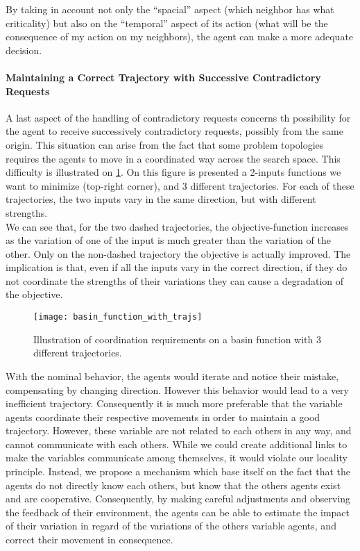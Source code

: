 By taking in account not only the \enquote{spacial} aspect (which neighbor has what criticality) but also on the \enquote{temporal} aspect of its action (what will be the consequence of my action on my neighbors), the agent can make a more adequate decision.

\paragraph*{Maintaining a Correct Trajectory with Successive Contradictory Requests}

A last aspect of the handling of contradictory requests concerns th possibility for the agent to receive successively contradictory requests, possibly from the same origin. This situation can arise from the fact that some problem topologies requires the agents to move in a coordinated way across the search space. This difficulty is illustrated on \figurename{} \ref{basin_fun_illustration}. On this figure is presented a 2-inputs functions we want to minimize (top-right corner), and 3 different trajectories. For each of these trajectories, the two inputs vary in the same direction, but with different strengths.\\
We can see that, for the two dashed trajectories, the objective-function increases as the variation of one of the input is much greater than the variation of the other. Only on the non-dashed trajectory the objective is actually improved. The implication is that, even if all the inputs vary in the correct direction, if they do not coordinate the strengths of their variations they can cause a degradation of the objective.

\begin{figure}
\centering
\texttt{[image: basin\_function\_with\_trajs]}
\caption{Illustration of coordination requirements on a basin function with 3 different trajectories.}\label{basin_fun_illustration}
\end{figure}

With the nominal behavior, the agents would iterate and notice their mistake, compensating by changing direction. However this behavior would lead to a very inefficient trajectory. Consequently it is much more preferable that the variable agents coordinate their respective movements in order to maintain a good trajectory. However, these variable are not related to each others in any way, and cannot communicate with each others. While we could create additional links to make the variables communicate among themselves, it would violate our locality principle. Instead, we propose a mechanism which base itself on the fact that the agents do not directly know each others, but know that the others agents exist and are cooperative. Consequently, by making careful adjustments and observing the feedback of their environment, the agents can be able to estimate the impact of their variation in regard of the variations of the others variable agents, and correct their movement in consequence.

